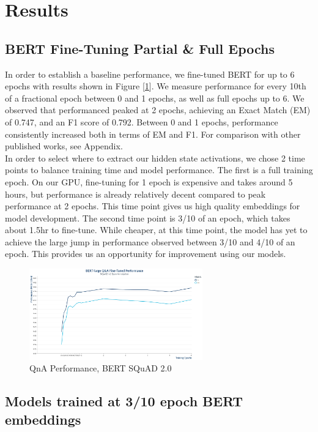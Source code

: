 \section{Results}

\subsection{BERT Fine-Tuning Partial \& Full Epochs}

In order to establish a baseline performance, we fine-tuned BERT for up to 6 epochs with results shown in Figure [\ref{fig:QnABertPerformance}]. We measure performance for every 10th of a fractional epoch between 0 and 1 epochs, as well as full epochs up to 6. We observed that performanced peaked at 2 epochs, achieving an Exact Match (EM) of 0.747, and an F1 score of 0.792. Between 0 and 1 epochs, performance consistently increased both in terms of EM and F1. For comparison with other published works, see Appendix. \\

In order to select where to extract our hidden state activations, we chose 2 time points to balance training time and model performance. The first is a full training epoch. On our GPU, fine-tuning for 1 epoch is expensive and takes around 5 hours, but performance is already relatively decent compared to peak performance at 2 epochs. This time point gives us high quality embeddings for model development. The second time point is 3/10 of an epoch, which takes about 1.5hr to fine-tune. While cheaper, at this time point, the model has yet to achieve the large jump in performance observed between 3/10 and 4/10 of an epoch. This provides us an opportunity for improvement using our models. 

\begin{figure}[ht]
	\centering
	\includegraphics[width=75mm]{images/QnA_BERT_Training_Performance_plot.png}
	\caption{\label{fig:QnABertPerformance}QnA Performance, BERT SQuAD 2.0}
\end{figure}

\subsection{Models trained at 3/10 epoch BERT embeddings}

